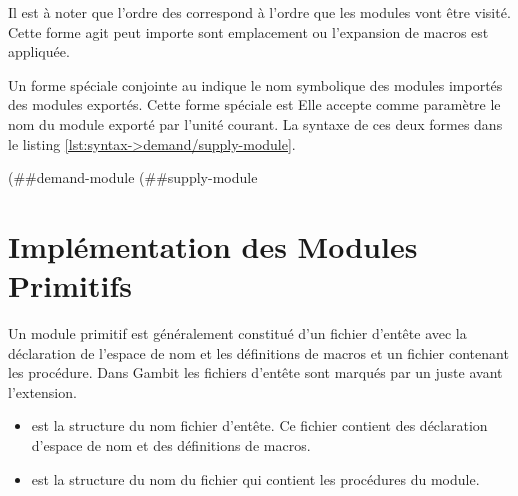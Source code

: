 Il est à noter que l'ordre des  correspond à l'ordre
que les modules vont être visité. Cette forme agit peut importe sont emplacement
ou l'expansion de macros est appliquée.



Un forme spéciale conjointe au  indique le nom
symbolique des modules importés des modules exportés. Cette forme spéciale est
 Elle accepte comme paramètre le nom du module exporté
par l'unité courant.  La syntaxe de ces deux formes dans le listing
\ref{lst:syntax->demand/supply-module}.\\
\begin{center}
  \begin{mplisting}{0.8}
(##demand-module %
(##supply-module %
\end{mplisting}
\end{center}



\section{Implémentation des Modules Primitifs}

Un module primitif est généralement constitué d'un fichier d'entête avec la
déclaration de l'espace de nom et les définitions de macros et un fichier
contenant les procédure. Dans Gambit les fichiers d'entête sont marqués par un
\lstcode{#} juste avant l'extension.

\begin{itemize}

  \item {} est la structure du nom fichier d'entête.
    Ce fichier contient des déclaration d'espace de nom et des
    définitions de macros.

  \item {} est la structure du nom du fichier qui contient
    les procédures du module.

\end{itemize}

